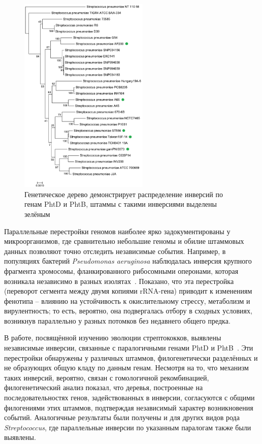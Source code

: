 \begin{figure}[h!]
    \centering
    \includegraphics[width=0.55\textwidth]{images/part1/strept-ola-pneu.pdf}
    \caption{Генетическое дерево демонстрирует распределение инверсий по генам PhtD и PhtB, штаммы с такими инверсиями выделены зелёным~\cite{Shelyakin2019}}
    \label{fig:tree-strept}
\end{figure}

Параллельные перестройки геномов наиболее ярко задокументированы у микроорганизмов, где сравнительно небольшие геномы и обилие штаммовых данных позволяют точно отследить независимые события.
Например, в популяциях бактерий \textit{Pseudomonas aeruginosa} наблюдалась инверсия крупного фрагмента хромосомы, фланкированного рибосомными оперонами, которая возникала независимо в разных изолятах~\cite{Irvine2019}.
Показано, что эта перестройка (переворот сегмента между двумя копиями rRNA-гена) приводит к изменениям фенотипа – влиянию на устойчивость к окислительному стрессу, метаболизм и вирулентность; то есть, вероятно, она подвергалась отбору в сходных условиях, возникнув параллельно у разных потомков без недавнего общего предка. 

В работе, посвящённой изучению эволюции стрептококков, выявлены независимые инверсии, связанные с паралогичными генами PhtD и PhtB~\cite{Shelyakin2019}.
Эти перестройки обнаружены у различных штаммов, филогенетически разделённых и не образующих общую кладу по данным генам.
Несмотря на то, что механизм таких инверсий, вероятно, связан с гомологичной рекомбинацией, филогенетический анализ показал, что деревья, построенные на последовательностях генов, задействованных в инверсии, согласуются с общими филогениями этих штаммов, подтверждая независимый характер возникновения событий.
Аналогичные результаты были получены и для других видов рода \textit{Streptococcus}, где параллельные инверсии по указанным паралогам также были выявлены.


